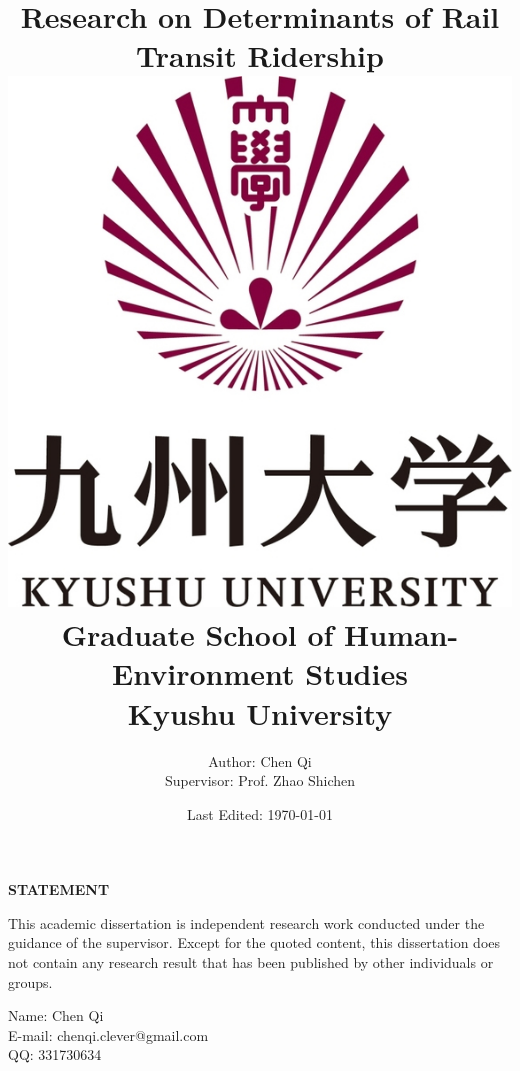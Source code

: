 \documentclass[12pt, twoside, a4paper]{book} %
\renewcommand{\baselinestretch}{1.5} %
\begin{document}
\title{
	{\Huge Research on Determinants of Rail Transit Ridership}\\
	{\vspace{3cm}}
	{\includegraphics[width=0.2\linewidth]{university.jpg}}\\
	{\vspace{2cm}}
	{\large Graduate School of Human-Environment Studies}\\
	{\large Kyushu University}
}
\author{
	{\large Author: Chen Qi}\\
	{\large Supervisor: Prof. Zhao Shichen}
	{\vspace{1cm}}
}
\date{\normalsize Last Edited: \today}
\maketitle

\centerline{\textbf{\Large STATEMENT}}
%
This academic dissertation is independent research work conducted under the guidance of the supervisor. Except for the quoted content, this dissertation does not contain any research result that has been published by other individuals or groups.\\
\newline
\newline
%
%

\begin{flushright}
	Name: Chen Qi \\
	E-mail: chenqi.clever@gmail.com \\
	QQ: 331730634 \\
\end{flushright}

\renewcommand{\baselinestretch}{1.0} %
\fontsize{14pt}{14pt} %
\selectfont

\tableofcontents %
\listoffigures %
\listoftables %
\end{document}
